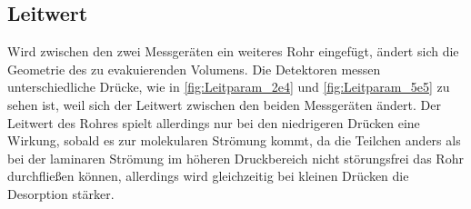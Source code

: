 \subsection{Leitwert}

Wird zwischen den zwei Messgeräten ein weiteres Rohr eingefügt, ändert sich die Geometrie des zu evakuierenden Volumens.
Die Detektoren messen unterschiedliche Drücke, wie in \ref{fig:Leitparam_2e4} und \ref{fig:Leitparam_5e5} zu sehen ist, weil sich der Leitwert zwischen den beiden Messgeräten ändert.
Der Leitwert des Rohres spielt allerdings nur bei den niedrigeren Drücken eine Wirkung, sobald es zur molekularen Strömung kommt,
da die Teilchen anders als bei der laminaren Strömung im höheren Druckbereich nicht störungsfrei das Rohr durchfließen können, allerdings wird gleichzeitig bei kleinen Drücken die Desorption stärker. \\
